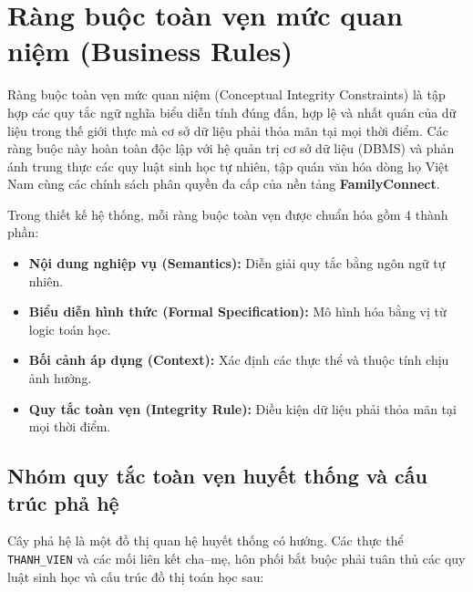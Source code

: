 \section{Ràng buộc toàn vẹn mức quan niệm (Business Rules)}
\label{sec:1_4_rang_buoc_quan_niem}

Ràng buộc toàn vẹn mức quan niệm (Conceptual Integrity Constraints) là tập hợp các quy tắc ngữ nghĩa biểu diễn tính đúng đắn, hợp lệ và nhất quán của dữ liệu trong thế giới thực mà cơ sở dữ liệu phải thỏa mãn tại mọi thời điểm. Các ràng buộc này hoàn toàn độc lập với hệ quản trị cơ sở dữ liệu (DBMS) và phản ánh trung thực các quy luật sinh học tự nhiên, tập quán văn hóa dòng họ Việt Nam cùng các chính sách phân quyền đa cấp của nền tảng \textbf{FamilyConnect}.

Trong thiết kế hệ thống, mỗi ràng buộc toàn vẹn được chuẩn hóa gồm 4 thành phần:
\begin{itemize}[noitemsep,topsep=2pt]
    \item \textbf{Nội dung nghiệp vụ (Semantics):} Diễn giải quy tắc bằng ngôn ngữ tự nhiên.
    \item \textbf{Biểu diễn hình thức (Formal Specification):} Mô hình hóa bằng vị từ logic toán học.
    \item \textbf{Bối cảnh áp dụng (Context):} Xác định các thực thể và thuộc tính chịu ảnh hưởng.
    \item \textbf{Quy tắc toàn vẹn (Integrity Rule):} Điều kiện dữ liệu phải thỏa mãn tại mọi thời điểm.
\end{itemize}

\subsection{Nhóm quy tắc toàn vẹn huyết thống và cấu trúc phả hệ}
Cây phả hệ là một đồ thị quan hệ huyết thống có hướng. Các thực thể \texttt{THANH\_VIEN} và các mối liên kết cha--mẹ, hôn phối bắt buộc phải tuân thủ các quy luật sinh học và cấu trúc đồ thị toán học sau:

